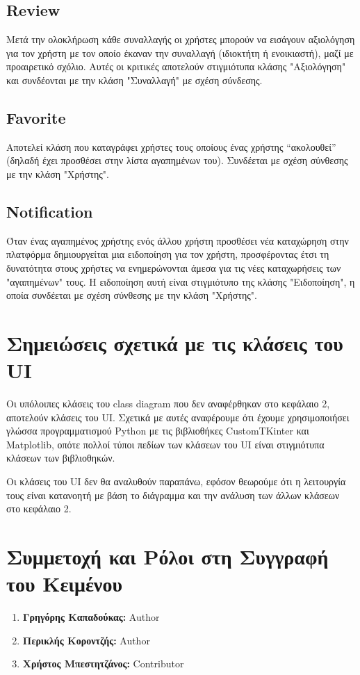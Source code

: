 \documentclass[12pt,a4paper]{article}
\begin{document}
\subsection{Review}
Μετά την ολοκλήρωση κάθε συναλλαγής οι χρήστες μπορούν να εισάγουν αξιολόγηση για τον χρήστη με τον οποίο έκαναν την συναλλαγή (ιδιοκτήτη ή ενοικιαστή), μαζί με προαιρετικό σχόλιο. Αυτές οι κριτικές αποτελούν στιγμιότυπα κλάσης "Αξιολόγηση" και συνδέονται με την κλάση "Συναλλαγή" με σχέση σύνδεσης.


\subsection{Favorite}
Αποτελεί κλάση που καταγράφει χρήστες τους οποίους ένας χρήστης “ακολουθεί” (δηλαδή έχει προσθέσει στην λίστα αγαπημένων του). Συνδέεται με σχέση σύνθεσης με την κλάση "Χρήστης".

\subsection{Notification}
Όταν ένας αγαπημένος χρήστης ενός άλλου χρήστη προσθέσει νέα καταχώρηση στην πλατφόρμα δημιουργείται μια ειδοποίηση για τον χρήστη, προσφέροντας έτσι τη δυνατότητα στους χρήστες να ενημερώνονται άμεσα για τις νέες καταχωρήσεις των "αγαπημένων" τους. Η ειδοποίηση αυτή είναι στιγμιότυπο της κλάσης "Ειδοποίηση", η οποία συνδέεται με σχέση σύνθεσης με την κλάση "Χρήστης".

\section{Σημειώσεις σχετικά με τις κλάσεις του UI}

Οι υπόλοιπες κλάσεις του class diagram που δεν αναφέρθηκαν στο κεφάλαιο 2, αποτελούν κλάσεις του UI. Σχετικά με αυτές αναφέρουμε ότι έχουμε χρησιμοποιήσει γλώσσα προγραμματισμού Python με τις βιβλιοθήκες CustomTKinter και Matplotlib, οπότε πολλοί τύποι πεδίων των κλάσεων του UI είναι στιγμιότυπα κλάσεων των βιβλιοθηκών. 

Οι κλάσεις του UI δεν θα αναλυθούν παραπάνω, εφόσον θεωρούμε ότι η λειτουργία τους είναι κατανοητή με βάση το διάγραμμα και την ανάλυση των άλλων κλάσεων στο κεφάλαιο 2.

\section{Συμμετοχή και Ρόλοι στη Συγγραφή του Κειμένου}
\begin{enumerate}
	\item \textbf{Γρηγόρης Καπαδούκας:} Author
	\item \textbf{Περικλής Κοροντζής:} Author
    \item \textbf{Χρήστος Μπεστητζάνος:} Contributor
\end{enumerate}
\end{document}
